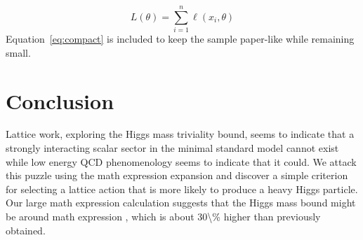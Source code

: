\documentclass[11pt]{article}
\begin{document}
\begin{equation}
\label{eq:compact}
L(\theta) = \sum_{i=1}^{n} \ell(x_i, \theta)
\end{equation}
Equation~\ref{eq:compact} is included to keep the sample paper-like while remaining small.

\section{Conclusion}

Lattice work, exploring the Higgs mass triviality bound, seems to indicate that a strongly interacting scalar sector in the minimal standard model cannot exist while low energy QCD phenomenology seems to indicate that it could. We attack this puzzle using the math expression expansion and discover a simple criterion for selecting a lattice action that is more likely to produce a heavy Higgs particle. Our large math expression calculation suggests that the Higgs mass bound might be around math expression , which is about 30\textbackslash{}\% higher than previously obtained.
\end{document}
